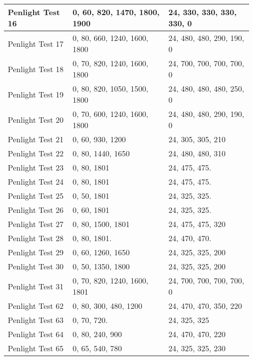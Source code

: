 \begin{table}[!h]
\begin{center}
\begin{tabular}{|l|l|l|}
Penlight Test 16  &  0, 60, 820, 1470, 1800, 1900  &  24, 330, 330, 330, 330, 0  \\ \hline
Penlight Test 17  &  0, 80, 660, 1240, 1600, 1800  &  24, 480, 480, 290, 190, 0  \\ \hline
Penlight Test 18  &  0, 70, 820, 1240, 1600, 1800  &  24, 700, 700, 700, 700, 0  \\ \hline
Penlight Test 19  &  0, 80, 820, 1050, 1500, 1800  &  24, 480, 480, 480, 250, 0  \\ \hline
Penlight Test 20  &  0, 70, 600, 1240, 1600, 1800  &  24, 480, 480, 290, 190, 0  \\ \hline
Penlight Test 21  &  0, 60, 930, 1200              &  24, 305, 305, 210          \\ \hline
Penlight Test 22  &  0, 80, 1440, 1650             &  24, 480, 480, 310          \\ \hline
Penlight Test 23  &  0, 80, 1801                   &  24, 475, 475.              \\ \hline
Penlight Test 24  &  0, 80, 1801                   &  24, 475, 475.              \\ \hline
Penlight Test 25  &  0, 50, 1801                   &  24, 325, 325.              \\ \hline
Penlight Test 26  &  0, 60, 1801                   &  24, 325, 325.              \\ \hline
Penlight Test 27  &  0, 80, 1500, 1801             &  24, 475, 475, 320          \\ \hline
Penlight Test 28  &  0, 80, 1801.                  &  24, 470, 470.              \\ \hline
Penlight Test 29  &  0, 60, 1260, 1650             &  24, 325, 325, 200          \\ \hline
Penlight Test 30  &  0, 50, 1350, 1800             &  24, 325, 325, 200          \\ \hline
Penlight Test 31  &  0, 70, 820, 1240, 1600, 1801  &  24, 700, 700, 700, 700, 0  \\ \hline
Penlight Test 62  &  0, 80, 300, 480, 1200         &  24, 470, 470, 350, 220     \\ \hline
Penlight Test 63  &  0, 70, 720.                   &  24, 325, 325               \\ \hline
Penlight Test 64  &  0, 80, 240, 900               &  24, 470, 470, 220          \\ \hline
Penlight Test 65  &  0, 65, 540, 780               &  24, 325, 325, 230          \\ \hline
\end{tabular}
\end{center}
\end{table}


